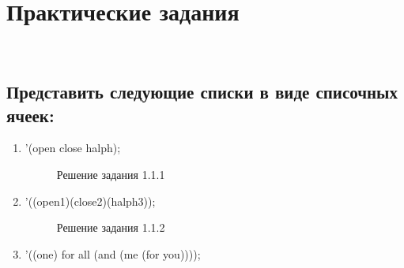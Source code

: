 \documentclass[12pt]{report}
\begin{document}
\chapter{Практические задания}
~\
\section{Представить следующие списки в виде списочных ячеек:}

\begin{enumerate}
	\item '(open close halph);
	\begin{figure}[!h]
		\caption{Решение задания 1.1.1}
	\end{figure}
	\item '((open1)(close2)(halph3));
	\begin{figure}[!h]
		\caption{Решение задания 1.1.2}
	\end{figure}
	\item '((one) for all (and (me (for you))));
	\begin{figure}[!h]

\end{figure}
\end{enumerate}
\end{document}
